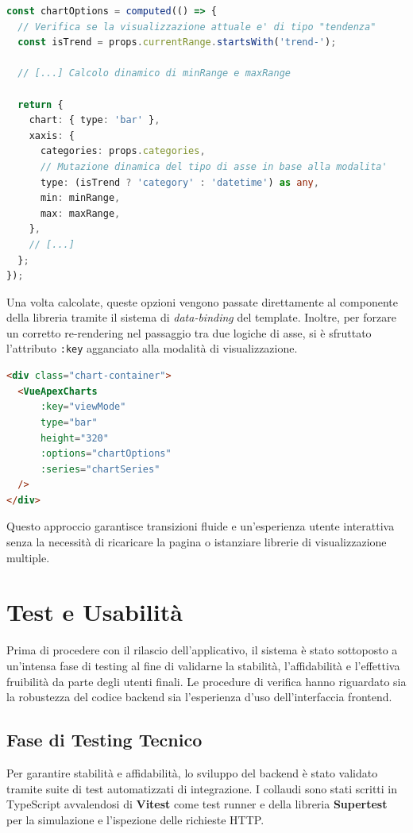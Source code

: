 \documentclass[11pt,a4paper]{report}
\begin{document}
\begin{lstlisting}[language=TypeScript, caption=Configurazione reattiva delle opzioni del grafico in Vue 3]
const chartOptions = computed(() => {
  // Verifica se la visualizzazione attuale e' di tipo "tendenza"
  const isTrend = props.currentRange.startsWith('trend-');

  // [...] Calcolo dinamico di minRange e maxRange

  return {
    chart: { type: 'bar' },
    xaxis: {
      categories: props.categories,
      // Mutazione dinamica del tipo di asse in base alla modalita'
      type: (isTrend ? 'category' : 'datetime') as any,
      min: minRange,
      max: maxRange,
    },
    // [...]
  };
});
\end{lstlisting}

Una volta calcolate, queste opzioni vengono passate direttamente al componente della libreria tramite il sistema di \textit{data-binding} del template. Inoltre, per forzare un corretto re-rendering nel passaggio tra due logiche di asse, si è sfruttato l'attributo \texttt{:key} agganciato alla modalità di visualizzazione.

\begin{lstlisting}[language=HTML, caption=Binding reattivo del grafico nel template]
<div class="chart-container">
  <VueApexCharts
      :key="viewMode"
      type="bar"
      height="320"
      :options="chartOptions"
      :series="chartSeries"
  />
</div>
\end{lstlisting}

Questo approccio garantisce transizioni fluide e un'esperienza utente interattiva senza la necessità di ricaricare la pagina o istanziare librerie di visualizzazione multiple.

\chapter{Test e Usabilità}

Prima di procedere con il rilascio dell'applicativo, il sistema è stato sottoposto a un'intensa fase di testing al fine di validarne la stabilità, l'affidabilità e l'effettiva fruibilità da parte degli utenti finali. Le procedure di verifica hanno riguardato sia la robustezza del codice backend sia l'esperienza d'uso dell'interfaccia frontend.

\section{Fase di Testing Tecnico}
Per garantire stabilità e affidabilità, lo sviluppo del backend è stato validato tramite suite di test automatizzati di integrazione. I collaudi sono stati scritti in TypeScript avvalendosi di \textbf{Vitest} come test runner e della libreria \textbf{Supertest} per la simulazione e l'ispezione delle richieste HTTP.
\end{document}

